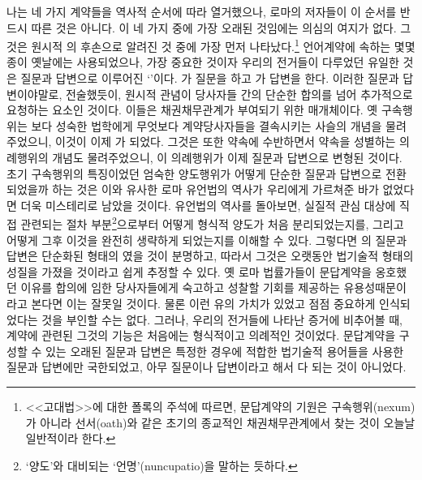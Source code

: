 나는 네 가지 계약들을 역사적 순서에 따라 열거했으나,
로마의  저자들이 이 순서를 반드시 따른 것은 아니다.
이 네 가지 중에 가장 오래된 것임에는 의심의 여지가 없다.
그것은 원시적 의 후손으로 알려진 것 중에 가장 먼저 나타났다.\footnote{%
  <<고대법>>에 대한 폴록의 주석에 따르면,
  문답계약의 기원은 구속행위(nexum)가 아니라
  선서(oath)와 같은 초기의 종교적인 채권채무관계에서 찾는 것이
  오늘날
  일반적이라 한다.
  }
언어계약에 속하는 몇몇 종이 옛날에는 사용되었으나,
가장 중요한 것이자 우리의 전거들이 다루었던 유일한 것은
질문과 답변으로 이루어진 `'이다.
가 질문을 하고 가 답변을 한다.
이러한 질문과 답변이야말로, 전술했듯이,
원시적 관념이
당사자들 간의 단순한 합의를 넘어 추가적으로 요청하는 요소인 것이다.
이들은 채권채무관계가 부여되기 위한 매개체이다.
옛 구속행위는
보다 성숙한 법학에게 무엇보다
계약당사자들을 결속시키는 사슬의 개념을 물려주었으니,
이것이 이제 가 되었다.
그것은 또한 약속에 수반하면서 약속을 성별하는
의례행위의 개념도 물려주었으니,
이 의례행위가 이제 질문과 답변으로 변형된 것이다.
초기 구속행위의 특징이었던 엄숙한 양도행위가
어떻게 단순한 질문과 답변으로 전환되었을까 하는 것은
이와 유사한 로마 유언법의 역사가 우리에게 가르쳐준 바가 없었다면
더욱 미스테리로 남았을 것이다.
유언법의 역사를 돌아보면,
실질적 관심 대상에 직접 관련되는 절차 부분\footnote{%
  `양도'와 대비되는 `언명'(nuncupatio)을 말하는 듯하다.
}으로부터
어떻게
형식적 양도가
처음 분리되었는지를,
그리고 어떻게 그후 이것을 완전히 생략하게 되었는지를
이해할 수 있다.
그렇다면
의 질문과 답변은 단순화된 형태의 였을 것이 분명하고,
따라서
그것은 오랫동안 법기술적 형태의 성질을 가졌을 것이라고 쉽게 추정할 수 있다.
옛 로마 법률가들이 문답계약을 옹호했던 이유를
합의에 임한 당사자들에게 숙고하고 성찰할 기회를 제공하는
유용성때문이라고 본다면 이는 잘못일 것이다.
물론 이런 유의 가치가 있었고 점점 중요하게
인식되었다는 것을 부인할 수는 없다.
그러나, 우리의 전거들에 나타난 증거에 비추어볼 때,
계약에 관련된 그것의 기능은 처음에는 형식적이고 의례적인 것이었다.
문답계약을 구성할 수 있는 오래된 질문과 답변은
특정한 경우에 적합한 법기술적 용어들을 사용한
질문과 답변에만 국한되었고,
아무 질문이나 답변이라고 해서 다 되는 것이 아니었다.

